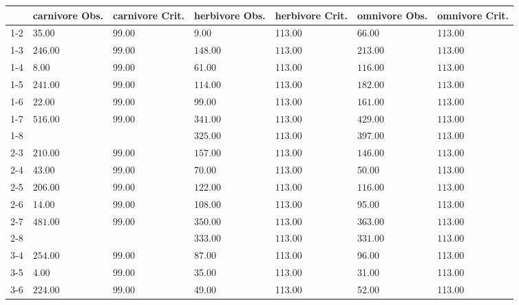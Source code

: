 \begin{table}[ht]
\centering
\begin{tabular}{rllllll}
  \toprule
 & carnivore Obs. & carnivore Crit. & herbivore Obs. & herbivore Crit. & omnivore Obs. & omnivore Crit. \\ 
  \midrule
1-2 & 35.00 & 99.00 & 9.00 & 113.00 & 66.00 & 113.00 \\ 
  1-3 & \(\mathbf{246.00}\) & \(\mathbf{99.00}\) & \(\mathbf{148.00}\) & \(\mathbf{113.00}\) & \(\mathbf{213.00}\) & \(\mathbf{113.00}\) \\ 
  1-4 & 8.00 & 99.00 & 61.00 & 113.00 & \(\mathbf{116.00}\) & \(\mathbf{113.00}\) \\ 
  1-5 & \(\mathbf{241.00}\) & \(\mathbf{99.00}\) & \(\mathbf{114.00}\) & \(\mathbf{113.00}\) & \(\mathbf{182.00}\) & \(\mathbf{113.00}\) \\ 
  1-6 & 22.00 & 99.00 & 99.00 & 113.00 & \(\mathbf{161.00}\) & \(\mathbf{113.00}\) \\ 
  1-7 & \(\mathbf{516.00}\) & \(\mathbf{99.00}\) & \(\mathbf{341.00}\) & \(\mathbf{113.00}\) & \(\mathbf{429.00}\) & \(\mathbf{113.00}\) \\ 
  1-8 &  &  & \(\mathbf{325.00}\) & \(\mathbf{113.00}\) & \(\mathbf{397.00}\) & \(\mathbf{113.00}\) \\ 
  2-3 & \(\mathbf{210.00}\) & \(\mathbf{99.00}\) & \(\mathbf{157.00}\) & \(\mathbf{113.00}\) & \(\mathbf{146.00}\) & \(\mathbf{113.00}\) \\ 
  2-4 & 43.00 & 99.00 & 70.00 & 113.00 & 50.00 & 113.00 \\ 
  2-5 & \(\mathbf{206.00}\) & \(\mathbf{99.00}\) & \(\mathbf{122.00}\) & \(\mathbf{113.00}\) & \(\mathbf{116.00}\) & \(\mathbf{113.00}\) \\ 
  2-6 & 14.00 & 99.00 & 108.00 & 113.00 & 95.00 & 113.00 \\ 
  2-7 & \(\mathbf{481.00}\) & \(\mathbf{99.00}\) & \(\mathbf{350.00}\) & \(\mathbf{113.00}\) & \(\mathbf{363.00}\) & \(\mathbf{113.00}\) \\ 
  2-8 &  &  & \(\mathbf{333.00}\) & \(\mathbf{113.00}\) & \(\mathbf{331.00}\) & \(\mathbf{113.00}\) \\ 
  3-4 & \(\mathbf{254.00}\) & \(\mathbf{99.00}\) & 87.00 & 113.00 & 96.00 & 113.00 \\ 
  3-5 & 4.00 & 99.00 & 35.00 & 113.00 & 31.00 & 113.00 \\ 
  3-6 & \(\mathbf{224.00}\) & \(\mathbf{99.00}\) & 49.00 & 113.00 & 52.00 & 113.00 \\ 

\end{tabular}
\end{table}
